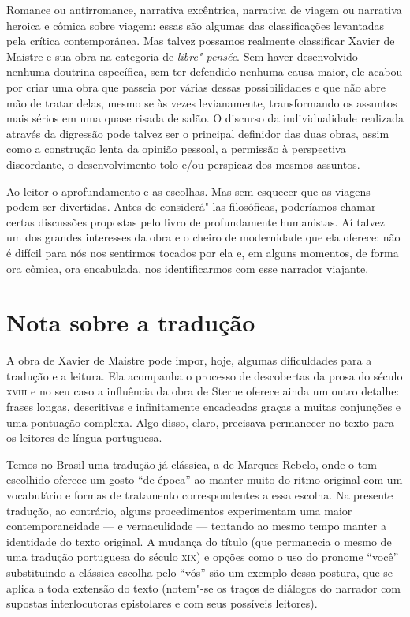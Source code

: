 Romance ou antirromance, narrativa excêntrica, narrativa de viagem ou
narrativa heroica e cômica sobre viagem: essas são algumas das
classificações levantadas pela crítica contemporânea. Mas talvez
possamos realmente classificar Xavier de Maistre e sua obra na
categoria de \textit{libre"-pensée}. Sem haver desenvolvido nenhuma
doutrina específica, sem ter defendido nenhuma causa maior, ele acabou
por criar uma obra que passeia por várias dessas possibilidades e que
não abre mão de tratar delas, mesmo se às vezes levianamente,
transformando os assuntos mais sérios em uma quase risada de salão.  O
discurso da individualidade realizada através da digressão pode talvez
ser o principal definidor das duas obras, assim como a construção lenta
da opinião pessoal, a permissão à perspectiva discordante, o
desenvolvimento tolo e/ou perspicaz dos mesmos assuntos. 

Ao leitor o aprofundamento e as escolhas. Mas sem esquecer que as
viagens podem ser divertidas. Antes de considerá"-las filosóficas,
poderíamos chamar certas discussões propostas pelo livro de
profundamente humanistas. Aí talvez um dos grandes interesses da obra e
o cheiro de modernidade que ela oferece: não é difícil para
nós nos sentirmos tocados por ela e, %
em alguns momentos, de forma ora cômica, ora encabulada, nos
identificarmos com esse narrador viajante.

\section*{Nota sobre a tradução}

A obra de Xavier de Maistre pode impor, hoje, algumas dificuldades 
para a tradução e a leitura. Ela acompanha o processo de descobertas da 
prosa do século \textsc{xviii} e no seu caso a influência da obra de Sterne oferece 
ainda um outro detalhe: frases longas, descritivas e infinitamente encadeadas 
graças a muitas conjunções e uma pontuação complexa. Algo disso, claro, precisava 
permanecer no texto para os leitores de língua portuguesa.
	
Temos no Brasil uma tradução já clássica, a de Marques Rebelo, onde o tom escolhido 
oferece um gosto ``de época'' ao manter muito do ritmo original com um vocabulário e 
formas de tratamento correspondentes a essa escolha. Na presente tradução, ao contrário, 
alguns procedimentos experimentam uma maior contemporaneidade --- e vernaculidade --- tentando 
ao mesmo tempo manter a identidade do texto original. A mudança do título (que permanecia o 
mesmo de uma tradução portuguesa do século \textsc{xix}) e opções como o uso do pronome ``você'' 
substituindo a clássica escolha pelo ``vós'' são um exemplo dessa postura, que se aplica a 
toda extensão do texto (notem"-se os traços de diálogos do narrador com supostas interlocutoras 
epistolares e com seus possíveis leitores). 

